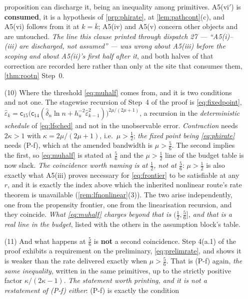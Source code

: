 \begin{remark}
\begin{enumerate}
proposition can discharge it, being an inequality among primitives. A5(vi$'$) is \textbf{consumed}, it is a hypothesis of
\cref{prp:phirate}, at \cref{lem:pathcont}(c), and A5(vi) follows from it at $k=\bar k$; A5(iv) and
A5(v) concern other objects and are untouched.
\emph{The line this clause printed through dispatch 27 --- ``A5(i)--(iii) are discharged, not assumed''
--- was wrong about A5(iii) before the scoping and about A5(ii)'s first half after it}, and both halves
of that correction are recorded here rather than only at the site that consumes them,
\cref{thm:rootn} Step~0.
\item[(10)] Where the threshold \eqref{eq:muhalf} comes from, and it is two conditions and not
one. The stagewise recursion of Step~4 of the proof is \eqref{eq:fixedpoint},
$\hat\varepsilon_k=\mathsf c_{15}\big(\mathsf c_{14}(\hat\delta_n\ln n+h_u^{-2}\hat\varepsilon_{k-1}^{2})\big)^{2\mu/(2\mu+1)}$,
a recursion in the \emph{deterministic schedule} of \eqref{eq:lfsched} and not in the unobservable error.
\emph{Contraction} needs $2\kappa>1$ with $\kappa=2\mu/(2\mu+1)$, i.e.\ $\mu>\tfrac12$; \emph{the fixed
point being \eqref{eq:phirate}} needs (P-f), which at the amended bandwidth is $\mu>\tfrac56$. The second
implies the first, so \eqref{eq:muhalf} is stated at $\tfrac56$ and the $\mu>\tfrac12$ line of the budget
table is now slack. \emph{The coincidence worth naming is at $\tfrac12$, not at $\tfrac56$}:
$\mu>\tfrac12$ is also exactly what A5(iii) proves necessary for \eqref{eq:frontier} to be satisfiable at
any $r$, and it is exactly the index above which the inherited nonlinear route's rate theorem is
unavailable (\cref{rem:lfnonlinear}(3)). The two arise independently, one from the propensity
frontier, one from the linearisation recursion, and they coincide. \emph{What \eqref{eq:muhalf}
charges beyond that is $(\tfrac12,\tfrac56]$, and that is a real line in the budget}, listed with the
others in the assumption block's table.
\item[(11)] And what happens at $\tfrac56$ is \textbf{not} a second coincidence. Step 4(a.1) of
the proof exhibits a requirement on the preliminary, \eqref{eq:prelimrate}, and shows it is weaker than
the rate delivered exactly when $\mu>\tfrac56$. That is (P-f) again, \emph{the same inequality},
written in the same primitives, up to the strictly positive factor $\kappa/(2\kappa-1)$. \emph{The
statement worth printing, and it is not a restatement of (P-f) either}: (P-f) is exactly the condition

\end{enumerate}
\end{remark}
